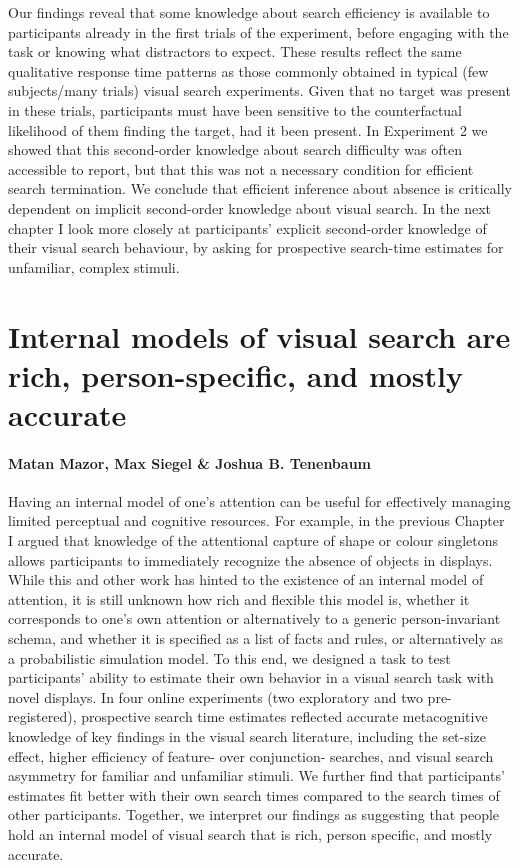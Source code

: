 \documentclass[12pt,twoside]{reedthesis}
\begin{document}
Our findings reveal that some knowledge about search efficiency is available to participants already in the first trials of the experiment, before engaging with the task or knowing what distractors to expect. These results reflect the same qualitative response time patterns as those commonly obtained in typical (few subjects/many trials) visual search experiments. Given that no target was present in these trials, participants must have been sensitive to the counterfactual likelihood of them finding the target, had it been present. In Experiment 2 we showed that this second-order knowledge about search difficulty was often accessible to report, but that this was not a necessary condition for efficient search termination. We conclude that efficient inference about absence is critically dependent on implicit second-order knowledge about visual search. In the next chapter I look more closely at participants' explicit second-order knowledge of their visual search behaviour, by asking for prospective search-time estimates for unfamiliar, complex stimuli.

\hypertarget{ch:MVS}{%
\chapter{Internal models of visual search are rich, person-specific, and mostly accurate}\label{ch:MVS}}

\hypertarget{matan-mazor-max-siegel-joshua-b.-tenenbaum}{%
\subsubsection*{Matan Mazor, Max Siegel \& Joshua B. Tenenbaum}\label{matan-mazor-max-siegel-joshua-b.-tenenbaum}}

Having an internal model of one's attention can be useful for effectively managing limited perceptual and cognitive resources. For example, in the previous Chapter I argued that knowledge of the attentional capture of shape or colour singletons allows participants to immediately recognize the absence of objects in displays. While this and other work has hinted to the existence of an internal model of attention, it is still unknown how rich and flexible this model is, whether it corresponds to one's own attention or alternatively to a generic person-invariant schema, and whether it is specified as a list of facts and rules, or alternatively as a probabilistic simulation model. To this end, we designed a task to test participants' ability to estimate their own behavior in a visual search task with novel displays. In four online experiments (two exploratory and two pre-registered), prospective search time estimates reflected accurate metacognitive knowledge of key findings in the visual search literature, including the set-size effect, higher efficiency of feature- over conjunction- searches, and visual search asymmetry for familiar and unfamiliar stimuli. We further find that participants' estimates fit better with their own search times compared to the search times of other participants. Together, we interpret our findings as suggesting that people hold an internal model of visual search that is rich, person specific, and mostly accurate.
\end{document}
